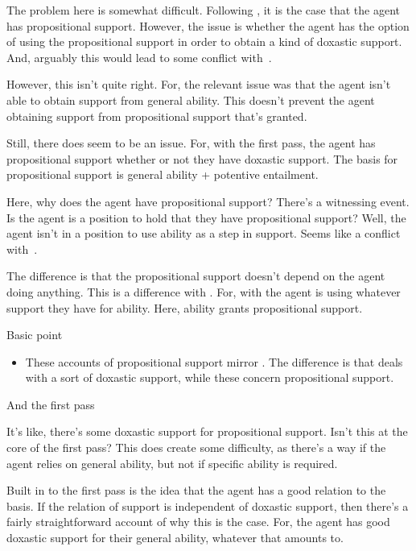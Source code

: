 {
  \begin{note}
    The problem here is somewhat difficult.
    Following \citeauthor{Turri:2010aa}, it is the case that the agent has propositional support.
    However, the issue is whether the agent has the option of using the propositional support in order to obtain a kind of doxastic support.
    And, arguably this would lead to some conflict with~\nI{}.

    However, this isn't quite right.
    For, the relevant issue was that the agent isn't able to obtain support from general ability.
    This doesn't prevent the agent obtaining support from propositional support that's granted.

    Still, there does seem to be an issue.
    For, with the first pass, the agent has propositional support whether or not they have doxastic support.
    The basis for propositional support is general ability + potentive entailment.

    Here, why does the agent have propositional support?
    There's a witnessing event.
    Is the agent is a position to hold that they have propositional support?
    Well, the agent isn't in a position to use ability as a step in support.
    Seems like a conflict with~\nI{}.

    The difference is that the propositional support doesn't depend on the agent doing anything.
    This is a difference with \AR{}.
    For, with \AR{} the agent is using whatever support they have for ability.
    Here, ability grants propositional support.

    Basic point
    \begin{itemize}
    \item These accounts of propositional support mirror \AR{}.
      The difference is that \AR{} deals with a sort of doxastic support, while these concern propositional support.
    \end{itemize}
    And the first pass

    It's like, there's some doxastic support for propositional support.
    Isn't this at the core of the first pass?
    This does create some difficulty, as there's a way if the agent relies on general ability, but not if specific ability is required.

    Built in to the first pass is the idea that the agent has a good relation to the basis.
    If the relation of support is independent of doxastic support, then there's a fairly straightforward account of why this is the case.
    For, the agent has good doxastic support for their general ability, whatever that amounts to.
  \end{note}

}
